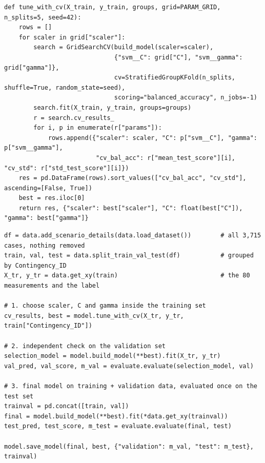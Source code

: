 \documentclass[11pt,a4paper]{article}
\newcommand{\code}[1]{\texttt{#1}}
\begin{document}
\begin{lstlisting}[caption={Hyperparameter selection by grouped five-fold cross-validation inside the training set (\code{model.py}).}]
def tune_with_cv(X_train, y_train, groups, grid=PARAM_GRID, n_splits=5, seed=42):
    rows = []
    for scaler in grid["scaler"]:
        search = GridSearchCV(build_model(scaler=scaler),
                              {"svm__C": grid["C"], "svm__gamma": grid["gamma"]},
                              cv=StratifiedGroupKFold(n_splits, shuffle=True, random_state=seed),
                              scoring="balanced_accuracy", n_jobs=-1)
        search.fit(X_train, y_train, groups=groups)
        r = search.cv_results_
        for i, p in enumerate(r["params"]):
            rows.append({"scaler": scaler, "C": p["svm__C"], "gamma": p["svm__gamma"],
                         "cv_bal_acc": r["mean_test_score"][i], "cv_std": r["std_test_score"][i]})
    res = pd.DataFrame(rows).sort_values(["cv_bal_acc", "cv_std"], ascending=[False, True])
    best = res.iloc[0]
    return res, {"scaler": best["scaler"], "C": float(best["C"]), "gamma": best["gamma"]}
\end{lstlisting}

\begin{lstlisting}[caption={Complete training and evaluation procedure (\code{train\_model.py} and the notebook).}]
df = data.add_scenario_details(data.load_dataset())        # all 3,715 cases, nothing removed
train, val, test = data.split_train_val_test(df)           # grouped by Contingency_ID
X_tr, y_tr = data.get_xy(train)                            # the 80 measurements and the label

# 1. choose scaler, C and gamma inside the training set
cv_results, best = model.tune_with_cv(X_tr, y_tr, train["Contingency_ID"])

# 2. independent check on the validation set
selection_model = model.build_model(**best).fit(X_tr, y_tr)
val_pred, val_score, m_val = evaluate.evaluate(selection_model, val)

# 3. final model on training + validation data, evaluated once on the test set
trainval = pd.concat([train, val])
final = model.build_model(**best).fit(*data.get_xy(trainval))
test_pred, test_score, m_test = evaluate.evaluate(final, test)

model.save_model(final, best, {"validation": m_val, "test": m_test}, trainval)
\end{lstlisting}
\end{document}
